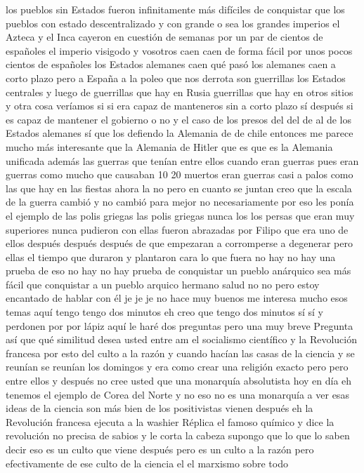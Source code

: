 los pueblos sin Estados fueron infinitamente más difíciles de conquistar que los pueblos con estado descentralizado y con grande
o sea los grandes imperios el Azteca y el Inca cayeron en cuestión de semanas por un par de cientos de españoles el imperio visigodo y vosotros caen
caen de forma fácil por unos pocos cientos de españoles los Estados alemanes caen
qué pasó los alemanes caen a corto plazo
pero a España a la poleo que nos derrota son guerrillas los Estados centrales y luego de guerrillas que hay en Rusia
guerrillas que hay en otros sitios y otra cosa veríamos si si era capaz de manteneros sin a corto plazo sí después si es capaz de mantener el gobierno o no
y el caso de los presos del del de al de los Estados alemanes sí que los defiendo la Alemania de de chile entonces me parece mucho más interesante
que la Alemania de Hitler que es que es la Alemania unificada además las guerras que tenían entre ellos cuando eran guerras
pues eran guerras como mucho que causaban 10 20 muertos eran guerras casi a palos como las que hay en las fiestas ahora la no
pero en cuanto se juntan creo que la escala de la guerra cambió y no cambió para mejor
no necesariamente por eso les ponía el ejemplo de las polis griegas las polis griegas nunca los los persas que eran muy superiores
nunca pudieron con ellas fueron abrazadas por Filipo que era uno de ellos
después después después de que empezaran a corromperse a degenerar pero ellas el tiempo que duraron y plantaron cara
lo que fuera no hay no hay una prueba de eso no hay no hay prueba de conquistar un pueblo anárquico sea más fácil que conquistar a un pueblo arquico
hermano salud no no pero estoy encantado de hablar con él
je je je no hace muy buenos me interesa mucho esos temas aquí tengo tengo dos minutos eh
creo que tengo dos minutos sí sí y perdonen por por lápiz aquí le haré dos preguntas pero una muy breve
Pregunta
así que qué similitud desea usted entre am el socialismo científico y la Revolución francesa
por esto del culto a la razón y cuando hacían las casas de la ciencia y se reunían se reunían los domingos y era como crear una religión
exacto pero pero entre ellos y después no cree usted que una monarquía absolutista
hoy en día eh tenemos el ejemplo de Corea del Norte y no eso no es una monarquía
a ver esas ideas de la ciencia son más bien de los positivistas vienen después eh la Revolución francesa ejecuta a la washier
Réplica
el famoso químico y dice la revolución no precisa de sabios y le corta la cabeza supongo que lo que lo saben decir
eso es un culto que viene después pero es un culto a la razón pero efectivamente de ese culto de la ciencia el el marxismo sobre todo
